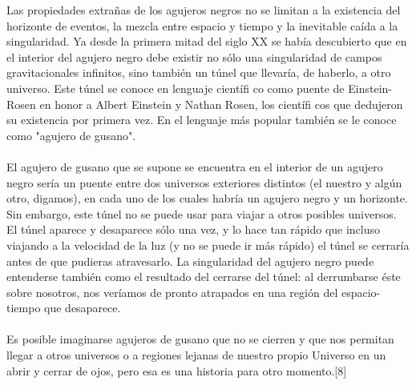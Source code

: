 \documentclass[12pt]{article}
\begin{document}
Las propiedades extrañas de los agujeros negros no se limitan a la existencia del horizonte de eventos, la mezcla entre espacio y tiempo y la inevitable caída a la singularidad. Ya desde la primera mitad del siglo XX se había descubierto que en el interior del agujero negro debe existir no sólo una singularidad de campos gravitacionales infinitos, sino también un túnel que llevaría, de haberlo, a otro universo. Este túnel se conoce en lenguaje científi co como puente de Einstein- Rosen en honor a Albert Einstein y Nathan Rosen, los científi cos que dedujeron su existencia por primera vez. En el lenguaje más popular también se le conoce como "agujero de gusano".\\\\
El agujero de gusano que se supone se encuentra en el interior de un agujero negro sería un puente entre dos universos exteriores distintos (el nuestro y algún otro, digamos), en cada uno de los cuales habría un agujero negro y un horizonte. Sin embargo, este túnel no se puede usar para viajar a otros posibles universos. El túnel aparece y desaparece sólo una vez, y lo hace tan rápido que incluso viajando a la velocidad de la luz (y no se puede ir más rápido) el túnel se cerraría antes de que pudieras atravesarlo. La singularidad del agujero negro puede entenderse también como el resultado del cerrarse del túnel: al derrumbarse éste sobre nosotros, nos veríamos de pronto atrapados en una región del espacio-tiempo que desaparece.\\\\
Es posible imaginarse agujeros de gusano que no se cierren y que nos permitan llegar a otros universos o a regiones lejanas de nuestro propio Universo en un abrir y cerrar de ojos, pero esa es una historia para otro momento.[8]
\\%
\end{document}
